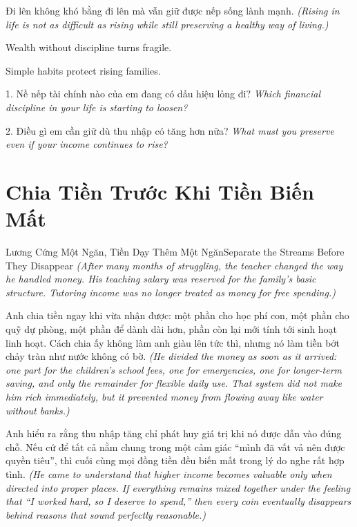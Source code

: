 \begin{baihoc}
Đi lên không khó bằng đi lên mà vẫn giữ được nếp sống lành mạnh.
\textit{(Rising in life is not as difficult as rising while still preserving a healthy way of living.)}
\end{baihoc}

\begin{ghinhoanh}
Wealth without discipline turns fragile.

Simple habits protect rising families.
\end{ghinhoanh}

\begin{tuhocnhanh}
1. Nề nếp tài chính nào của em đang có dấu hiệu lỏng đi? \textit{Which financial discipline in your life is starting to loosen?}

2. Điều gì em cần giữ dù thu nhập có tăng hơn nữa? \textit{What must you preserve even if your income continues to rise?}
\end{tuhocnhanh}
\ngancach

\section{Chia Tiền Trước Khi Tiền Biến Mất}
\begin{truyen}{Lương Cứng Một Ngăn, Tiền Dạy Thêm Một Ngăn}{Separate the Streams Before They Disappear}
\textit{(After many months of struggling, the teacher changed the way he handled money. His teaching salary was reserved for the family’s basic structure. Tutoring income was no longer treated as money for free spending.)}

Anh chia tiền ngay khi vừa nhận được: một phần cho học phí con, một phần cho quỹ dự phòng, một phần để dành dài hơn, phần còn lại mới tính tới sinh hoạt linh hoạt. Cách chia ấy không làm anh giàu lên tức thì, nhưng nó làm tiền bớt chảy tràn như nước không có bờ.
\textit{(He divided the money as soon as it arrived: one part for the children’s school fees, one for emergencies, one for longer-term saving, and only the remainder for flexible daily use. That system did not make him rich immediately, but it prevented money from flowing away like water without banks.)}

Anh hiểu ra rằng thu nhập tăng chỉ phát huy giá trị khi nó được dẫn vào đúng chỗ. Nếu cứ để tất cả nằm chung trong một cảm giác ``mình đã vất vả nên được quyền tiêu'', thì cuối cùng mọi đồng tiền đều biến mất trong lý do nghe rất hợp tình.
\textit{(He came to understand that higher income becomes valuable only when directed into proper places. If everything remains mixed together under the feeling that ``I worked hard, so I deserve to spend,'' then every coin eventually disappears behind reasons that sound perfectly reasonable.)}
\end{truyen}

